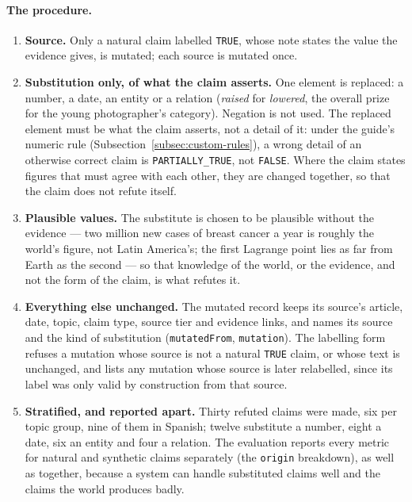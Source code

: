 \paragraph{The procedure.}
\begin{enumerate}[leftmargin=*]
    \item \textbf{Source.} Only a natural claim labelled
    \texttt{TRUE}, whose note states the value the evidence gives, is
    mutated; each source is mutated once.
    \item \textbf{Substitution only, of what the claim asserts.} One
    element is replaced: a number, a date, an entity or a relation
    (\emph{raised} for \emph{lowered}, the overall prize for the young
    photographer's category). Negation is not used. The replaced
    element must be what the claim asserts, not a detail of it: under
    the guide's numeric rule (Subsection~\ref{subsec:custom-rules}), a
    wrong detail of an otherwise correct claim is
    \texttt{PARTIALLY\_TRUE}, not \texttt{FALSE}. Where the claim
    states figures that must agree with each other, they are changed
    together, so that the claim does not refute itself.
    \item \textbf{Plausible values.} The substitute is chosen to be
    plausible without the evidence --- two million new cases of breast
    cancer a year is roughly the world's figure, not Latin America's;
    the first Lagrange point lies as far from Earth as the second ---
    so that knowledge of the world, or the evidence, and not the form
    of the claim, is what refutes it.
    \item \textbf{Everything else unchanged.} The mutated record keeps
    its source's article, date, topic, claim type, source tier and
    evidence links, and names its source and the kind of substitution
    (\texttt{mutatedFrom}, \texttt{mutation}). The labelling form
    refuses a mutation whose source is not a natural \texttt{TRUE}
    claim, or whose text is unchanged, and lists any mutation whose
    source is later relabelled, since its label was only valid by
    construction from that source.
    \item \textbf{Stratified, and reported apart.} Thirty refuted
    claims were made, six per topic group, nine of them in Spanish;
    twelve substitute a number, eight a date, six an entity and four a
    relation. The evaluation reports every metric for natural and
    synthetic claims separately (the \texttt{origin} breakdown), as
    well as together, because a system can handle substituted claims
    well and the claims the world produces badly.
\end{enumerate}

